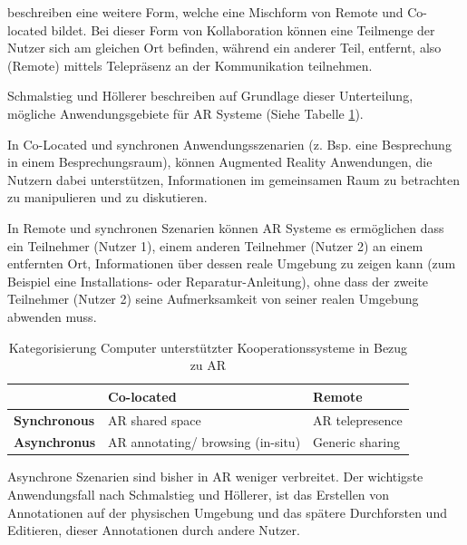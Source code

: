 \cite[S.~188]{ElSayedNevenA.M.BruceH.ThomasRossT.Smith2015} beschreiben eine weitere Form, welche eine Mischform von Remote und Co-located bildet. 
Bei dieser Form von Kollaboration können eine Teilmenge der Nutzer sich am gleichen Ort befinden, während ein anderer Teil, entfernt, 
also (Remote) mittels Telepräsenz an der Kommunikation teilnehmen. 

Schmalstieg und Höllerer \cite{DieterSchmalstieg2016} beschreiben auf Grundlage dieser Unterteilung, mögliche 
Anwendungsgebiete für AR Systeme (Siehe Tabelle \ref{tab:categorycscw}).

\cite{DieterSchmalstieg2016} In Co-Located und synchronen Anwendungsszenarien (z. Bsp. eine Besprechung in einem Besprechungsraum), können 
Augmented Reality Anwendungen, die Nutzern dabei unterstützen, Informationen im gemeinsamen Raum zu betrachten zu manipulieren und zu diskutieren. 

In Remote und synchronen Szenarien können AR Systeme es ermöglichen dass ein Teilnehmer (Nutzer 1), einem anderen Teilnehmer (Nutzer 2) an einem entfernten Ort, Informationen über dessen reale Umgebung zu zeigen 
kann (zum Beispiel eine Installations- oder Reparatur-Anleitung), ohne dass der zweite Teilnehmer (Nutzer 2) seine Aufmerksamkeit von seiner realen Umgebung abwenden muss.

\begin{table}[htbp]
\caption{Kategorisierung Computer unterstützter Kooperationssysteme in Bezug zu AR}
	\begin{center}
		\begin{tabular}{|l|ll|}
		\hline
		 & \textbf{Co-located} & \textbf{Remote}\\
		\hline
		\textbf{Synchronous} &  AR shared space & AR telepresence \\
		\textbf{Asynchronus} & AR annotating/ browsing (in-situ) & Generic sharing\\
		\hline
		\end{tabular}
	\end{center}
	\label{tab:categorycscw}
\end{table}

\cite[S.~362]{DieterSchmalstieg2016} Asynchrone Szenarien sind bisher in AR weniger verbreitet. Der wichtigste Anwendungsfall nach Schmalstieg und Höllerer, 
ist das Erstellen von Annotationen auf der physischen Umgebung und das spätere Durchforsten und Editieren, dieser Annotationen durch andere Nutzer. 

